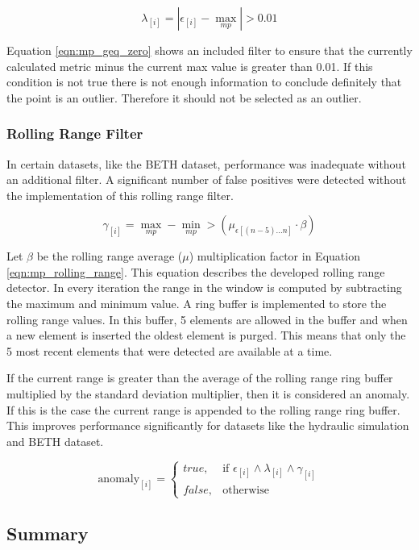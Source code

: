 \begin{equation}
    \label{eqn:mp_geq_zero}
    \lambda_{[i]} = \left| \epsilon_{[i]} - \max_{mp} \right| > 0.01
\end{equation}

Equation \eqref{eqn:mp_geq_zero} shows an included filter to ensure that the currently calculated metric minus the current max value is greater than 0.01. If this condition is not true there is not enough information to conclude definitely that the point is an outlier. Therefore it should not be selected as an outlier.

\subsubsection{Rolling Range Filter}

In certain datasets, like the BETH dataset, performance was inadequate without an additional filter. A significant number of false positives were detected without the implementation of this rolling range filter.

\begin{equation}
    \label{eqn:mp_rolling_range}
    \gamma_{[i]} = \max_{mp} - \min_{mp} > \left(\mu_{\epsilon[(n-5)...n]} \cdot \beta \right)
\end{equation}

Let $ \beta$ be the rolling range average ($\mu$) multiplication factor in Equation \eqref{eqn:mp_rolling_range}. This equation describes the developed rolling range detector. In every iteration the range in the window is computed by subtracting the maximum and minimum value. A ring buffer is implemented to store the rolling range values. In this buffer, 5 elements are allowed in the buffer and when a new element is inserted the oldest element is purged. This means that only the 5 most recent elements that were detected are available at a time.

If the current range is greater than the average of the rolling range ring buffer multiplied by the standard deviation multiplier, then it is considered an anomaly. If this is the case the current range is appended to the rolling range ring buffer. This improves performance significantly for datasets like the hydraulic simulation and BETH dataset.

\begin{equation}
    \label{eqn:mp_cumulative}
        \text{anomaly}_{[i]}= 
    \begin{cases}
        true,& \text{if } \epsilon_{[i]} \land \lambda_{[i]} \land \gamma_{[i]}\\
        false,              & \text{otherwise}
    \end{cases}
\end{equation}

\subsection{Summary}